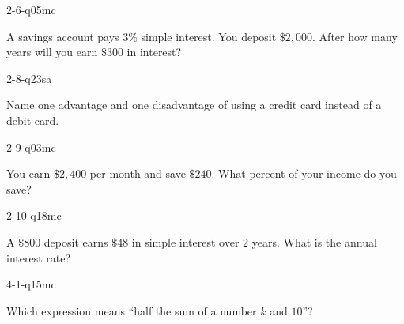 \begin{practiceQuestion}{2-6-q05}{mc}
\begin{questionText}
A savings account pays $3\%$ simple interest. You deposit $\$2{,}000$. After how many years will you earn $\$300$ in interest?
\end{questionText}
\end{practiceQuestion}

\begin{practiceQuestion}{2-8-q23}{sa}
\begin{questionText}
Name one advantage and one disadvantage of using a credit card instead of a debit card.
\end{questionText}
\end{practiceQuestion}

\begin{practiceQuestion}{2-9-q03}{mc}
\begin{questionText}
You earn $\$2{,}400$ per month and save $\$240$. What percent of your income do you save?
\end{questionText}
\end{practiceQuestion}

\begin{practiceQuestion}{2-10-q18}{mc}
\begin{questionText}
A $\$800$ deposit earns $\$48$ in simple interest over $2$ years. What is the annual interest rate?
\end{questionText}
\end{practiceQuestion}

\begin{practiceQuestion}{4-1-q15}{mc}
\begin{questionText}
Which expression means ``half the sum of a number $k$ and $10$''?
\end{questionText}
\end{practiceQuestion}

